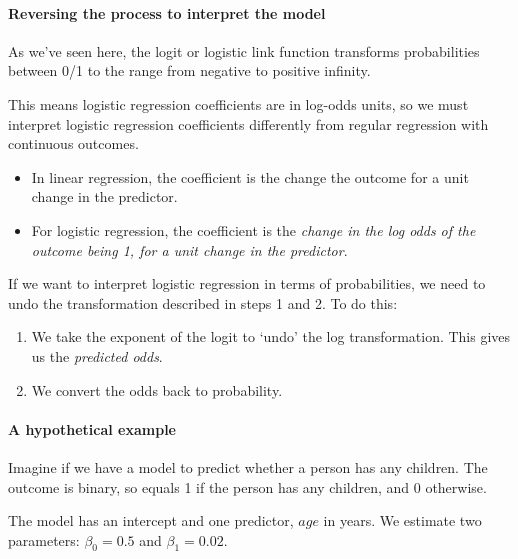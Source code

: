 \documentclass[]{article}
\let\oldparagraph\paragraph
\renewcommand{\paragraph}[1]{\oldparagraph{#1}\mbox{}}
\theoremstyle{definition}
\theoremstyle{definition}
\theoremstyle{definition}
\theoremstyle{remark}
\begin{document}
\paragraph{Reversing the process to interpret the
model}\label{reversing-the-process-to-interpret-the-model}

As we've seen here, the logit or logistic link function transforms
probabilities between 0/1 to the range from negative to positive
infinity.

This means logistic regression coefficients are in log-odds units, so we
must interpret logistic regression coefficients differently from regular
regression with continuous outcomes.

\begin{itemize}
\item
  In linear regression, the coefficient is the change the outcome for a
  unit change in the predictor.
\item
  For logistic regression, the coefficient is the \emph{change in the
  log odds of the outcome being 1, for a unit change in the predictor}.
\end{itemize}

If we want to interpret logistic regression in terms of probabilities,
we need to undo the transformation described in steps 1 and 2. To do
this:

\begin{enumerate}
\def\labelenumi{\arabic{enumi}.}
\item
  We take the exponent of the logit to `undo' the log transformation.
  This gives us the \emph{predicted odds}.
\item
  We convert the odds back to probability.
\end{enumerate}

\paragraph{A hypothetical example}\label{a-hypothetical-example}

Imagine if we have a model to predict whether a person has any children.
The outcome is binary, so equals 1 if the person has any children, and 0
otherwise.

The model has an intercept and one predictor, \(age\) in years. We
estimate two parameters: \(\beta_0 = 0.5\) and \(\beta_{1} = 0.02\).
\end{document}
